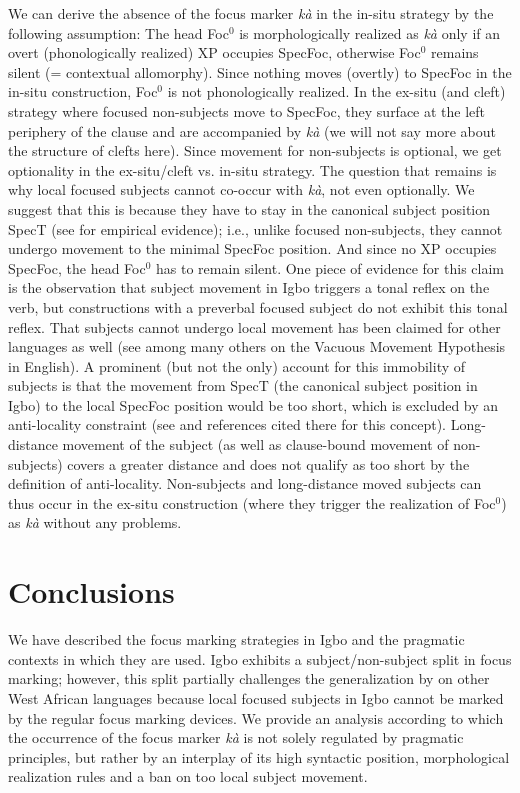 \documentclass[output=paper,colorlinks,citecolor=brown]{langscibook}
\begin{document}
We can derive the absence of the focus marker \textit{k\`a} in the in-situ strategy by the following assumption: The head Foc$^{0}$ is morphologically realized as \textit{k\`a} only if an overt (phonologically realized) XP occupies SpecFoc, otherwise Foc$^{0}$ remains silent (= contextual allomorphy). Since nothing moves (overtly) to SpecFoc in the in-situ construction, Foc$^{0}$ is not phonologically realized. In the ex-situ (and cleft) strategy where focused non-subjects move to SpecFoc, they surface at the left periphery of the clause and are accompanied by \textit{k\`a} (we will not say more about the structure of clefts here). Since movement for non-subjects is optional, we get optionality in the ex-situ/cleft vs. in-situ strategy. The question that remains is why local focused subjects cannot co-occur with  \textit{k\`a}, not even optionally. We suggest that this is because they have to stay in the canonical subject position SpecT (see \citealt{AmaechiGeorgi2019} for empirical evidence); i.e., unlike focused non-subjects, they cannot undergo movement to the minimal SpecFoc position. And since no XP occupies SpecFoc, the head Foc$^{0}$ has to remain silent. One piece of evidence for this claim is the observation that subject movement in Igbo triggers a tonal reflex on the verb, but constructions with a preverbal focused subject do not exhibit this tonal reflex. That subjects cannot undergo local movement has been claimed for other languages as well (see among many others \citealt{Chomsky1986, Agbayani1997} on the Vacuous Movement Hypothesis in English). A prominent (but not the only) account for this immobility of subjects is that the movement from SpecT (the canonical subject position in Igbo) to the local SpecFoc position would be too short, which is excluded by an anti-locality constraint (see \citealt{Abels2003, Grohmann2003, Erlewine2016} and references cited there for this concept). Long-distance movement of the subject (as well as clause-bound movement of non-subjects) covers a greater distance and does not qualify as too short by the definition of anti-locality. Non-subjects and long-distance moved subjects can thus occur in the ex-situ construction (where they trigger the realization of Foc$^{0}$) as \textit{k\`a} without any problems.

\section{Conclusions}\label{sec:amaechi:6}

We have described the focus marking strategies in Igbo and the pragmatic contexts in which they are used. Igbo exhibits a subject\slash non-subject split in focus marking; however, this split partially challenges the generalization by \citet{FiedlerEtAl2010} on other West African languages because local focused subjects in Igbo cannot be marked by the regular focus marking devices. We provide an analysis according to which the occurrence of the focus marker \textit{k\`a} is not solely regulated by pragmatic principles, but rather by an interplay of its high syntactic position, morphological realization rules and a ban on too local subject movement.
\end{document}
